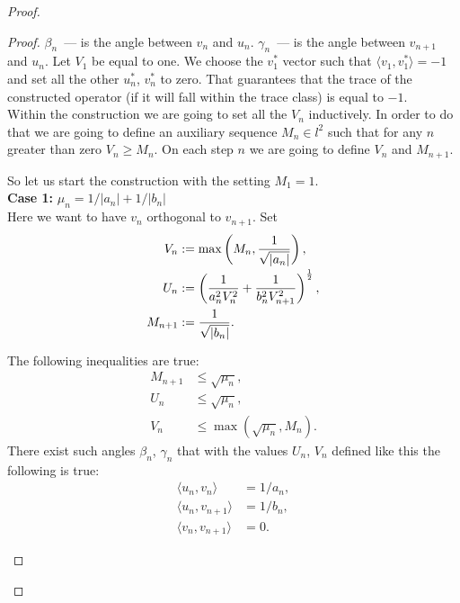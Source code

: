 \documentclass[12pt]{amsart}
\theoremstyle{case}
\begin{document}
\begin{proof}
\begin{proof}
          $\beta_n$~--- is the angle between $v_n$ and $u_n$.
          $\gamma_n$~--- is the angle between $v_{n + 1}$ and $u_n$.
          Let $V_1$ be equal to one.
          We choose the $v^*_1$ vector such that $\langle v_1, v^*_1 \rangle = -1$ and set all
          the other $u^*_n$, $v^*_n$ to zero. That guarantees that the trace of the constructed operator (if it
          will fall within the trace class) is equal to $-1$.\\
          Within the construction we are going to set all the $V_n$ inductively. In order to do
          that we are going to define an auxiliary sequence $M_n \in l^2$ such that for any $n$ greater than zero
          $V_n \geq M_n$. On each step $n$ we are going to define $V_n$ and $M_{n+1}$.
          
          So let us start the construction with the setting $M_1 = 1$.\\
          \textbf{Case 1:} $\mu_n = 1/|a_n| + 1/|b_n|$\\
              Here we want to have $v_n$ orthogonal to $v_{n+1}$.
              Set
              \begin{align*}
                  V_n &:= \max\left(M_n, \frac{1}{\sqrt{\smash[b]{|a_n|}}}\right),\\
                  U_n &:= \left(\frac{1}{a_n^2 V_n^2} + \frac{1}{b_n^2 V_{n+1}^2}\right)^\frac{1}{2},\\
                  M_{n+1} &:= \frac{1}{\sqrt{\smash[b]{|b_n|}}}.
              \end{align*}
              \begin{prop}
                  The following inequalities are true:
                  \begin{align*}
                      M_{n+1} &\leq \sqrt{\mu_n},\\
                      U_n &\leq \sqrt{\mu_n},\\
                      V_n &\leq \max(\sqrt{\mu_n}, M_n).
                  \end{align*}
                  There exist such angles $\beta_n$, $\gamma_n$ that with the values $U_n$, $V_n$ defined like this the following is true:
                  \begin{align*}
                      \langle u_n, v_n \rangle &= 1/a_n,\\
                      \langle u_n, v_{n+1} \rangle &= 1/b_n,\\
                      \langle v_n, v_{n+1} \rangle &= 0.
                  \end{align*}

\end{prop}
\end{proof}
\end{proof}
\end{document}
